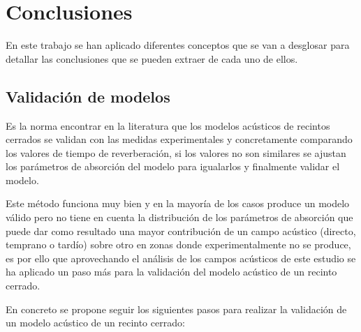 
\chapter{Conclusiones}
\label{conclusiones}

En este trabajo se han aplicado diferentes conceptos que se van a desglosar para detallar las conclusiones que se pueden extraer de cada uno de ellos.


\section{Validación de modelos}

Es la norma encontrar en la literatura que los modelos acústicos de recintos cerrados se validan con las medidas experimentales y concretamente comparando los valores de tiempo de reverberación, si los valores no son similares se ajustan los parámetros de absorción del modelo para igualarlos y finalmente validar el modelo.


Este método funciona muy bien y en la mayoría de los casos produce un modelo válido pero no tiene en cuenta la distribución de los parámetros de absorción que puede dar como resultado una mayor contribución de un campo acústico (directo, temprano o tardío) sobre otro en zonas donde experimentalmente no se produce, es por ello que aprovechando el análisis de los campos acústicos de este estudio se ha aplicado un paso más para la validación del modelo acústico de un recinto cerrado.

En concreto se propone seguir los siguientes pasos para realizar la validación de un modelo acústico de un recinto cerrado:

